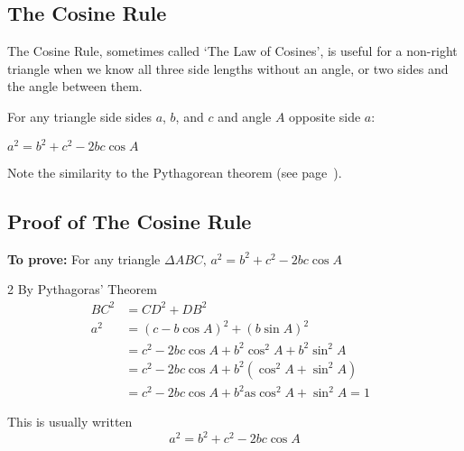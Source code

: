 \subsection*{The Cosine Rule}
The Cosine Rule, sometimes called `The Law of Cosines', is useful for a non-right triangle when we know all three side lengths without an angle, or two sides and the angle between them.

\begin{tcolorbox}
	For any triangle side sides $a$, $b$, and $c$ and angle $A$ opposite side $a$:\\
	\begin{center}
		$a^{2} =b^{2} +c^{2} -2 b c \cos  A$
	\end{center}	
\end{tcolorbox}
Note the similarity to the Pythagorean theorem (see page~\pageref{sec:pythagoras}).

\subsection*{Proof of The Cosine Rule}
\textbf{To prove:} For any triangle $ \Delta A B C\text{,}$ $a^{2} =b^{2} +c^{2} -2 b c \cos  A$ \\ 
\columnsep =30pt
\begin {multicols}{2}
\setlength\fboxrule{0in}\setlength\fboxsep{0.2in}
By Pythagoras' Theorem
\begin{align*}B C^{2} &  = C D^{2} +D B^{2} \\
a^{2} &  = \left (c -b \cos  A\right )^{2} +\left (b \sin  A\right )^{2} \\
&  = c^{2} -2 b c \cos  A +b^{2} \cos ^{2} A +b^{2} \sin ^{2} A \\
&  = c^{2} -2 b c \cos  A +b^{2} \left (\cos ^{2} A +\sin ^{2} A\right ) \\
&  = c^{2} -2 b c \cos  A +b^{2}\text{as}\cos ^{2} A +\sin ^{2} A =1\text{\ }\end{align*} 
\end {multicols}
This is usually written
\begin{equation*}a^{2} =b^{2} +c^{2} -2 b c \cos  A
\end{equation*}

